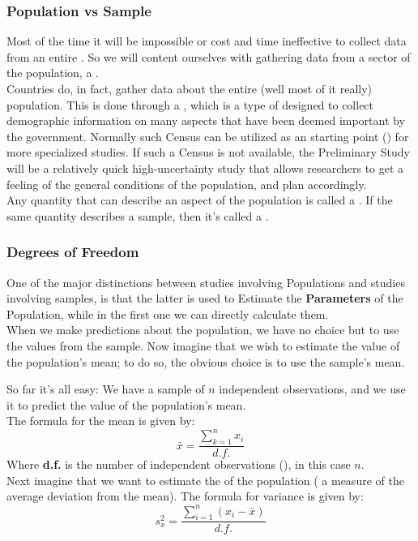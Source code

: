 \subsubsection{Population vs Sample}
Most of the time it will be impossible or cost and time ineffective to collect data from an entire . So we will content ourselves with gathering data from a sector of the population, \ie a .
\\
Countries do, in fact, gather data about the entire (well most of it really) population. This is done through a , which is a type of  designed to collect demographic information on many aspects that have been deemed important by the government. Normally such Census can be utilized as an starting point () for more specialized studies. If such a Census is not available, the Preliminary Study will be a relatively quick high-uncertainty study that allows researchers to get a feeling of the general conditions of the population, and plan accordingly.  
\\
Any quantity that can describe an aspect of the population is called a . If the same quantity describes a sample, then it's called a .

\subsubsection{Degrees of Freedom}
One of the major distinctions between studies involving Populations and studies involving samples, is that the latter is used to Estimate the \textbf{Parameters} of the Population, while in the first one we can directly calculate them.
\\
When we make predictions about the population, we have no choice but to use the values from the sample. Now imagine that we wish to estimate the value of the population's mean; to do so, the obvious choice is to use the sample's mean. 

So far it's all easy: We have a sample of \(n\) independent observations, and we use it to predict the value of the population's mean. 
\\
The formula for the mean is given by:
\begin{equation}
    \bar{x} = \frac{\sum_{k=1}^n x_i}{d.f.}
    \label{eq:mean}
\end{equation}
Where \textbf{d.f.} is the number of independent observations (), in this case \(n\).
\\
Next imagine that we want to estimate the  of the population ( a measure of the average deviation from the mean). The formula for variance is given by:
\begin{equation}
    s_x^2 = \frac{\sum_{i=1}^n \left(x_i-\bar{x}\right)}{d.f.}
    \label{eq:variance}
\end{equation}

